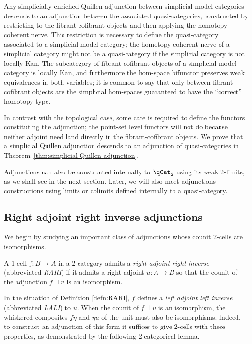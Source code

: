 \begin{ex}\label{ex:simp.quillen.adj}
Any simplicially enriched Quillen adjunction between simplicial model categories descends to an adjunction between the associated quasi-categories, constructed by restricting to the fibrant-cofibrant objects and then applying the homotopy coherent nerve. This restriction is necessary to define the quasi-category associated to a simplicial model category; the homotopy coherent nerve of a simplicial category might not be a quasi-category if the simplicial category is not locally Kan. The subcategory of fibrant-cofibrant objects of a simplicial model category is locally Kan, and furthermore the hom-space bifunctor preserves weak equivalences in both variables; it is common to say that only between fibrant-cofibrant objects are the simplicial hom-spaces guaranteed to have the ``correct'' homotopy type. 

In contrast with the topological case, some care is required to define the functors constituting the adjunction; the point-set level functors will not do because neither adjoint need land directly in the fibrant-cofibrant objects. We prove that  a simplicial Quillen adjunction descends to an adjunction of quasi-categories in Theorem~\ref{thm:simplicial-Quillen-adjunction}.
\end{ex}

Adjunctions can also be constructed internally to $\qCat_2$ using its weak 2-limits, as we shall see in the next section. Later, we will also meet adjunctions constructions using limits or colimits defined internally to a quasi-category.

\subsection{Right adjoint right inverse adjunctions}\label{subsec:RARI} 

We begin by studying an important class of adjunctions whose counit 2-cells are isomorphisms.

\begin{defn}\label{defn:RARI}
A 1-cell $f \colon B \to A$ in a 2-category admits a \emph{right adjoint right inverse} (abbreviated \emph{RARI}) if it admits a right adjoint $u \colon A \to B$ so that the counit of the adjunction $f \dashv u$ is an isomorphism.
\end{defn}

In the situation of Definition \ref{defn:RARI}, $f$ defines a \emph{left adjoint left inverse} (abbreviated \emph{LALI}) to $u$. When the counit of $f \dashv u$ is an isomorphism, the whiskered composites $f\eta$ and $\eta u$ of the unit must also be isomorphisms. Indeed, to construct an adjunction of this form it suffices to give 2-cells with these properties, as demonstrated by the following 2-categorical lemma. 

